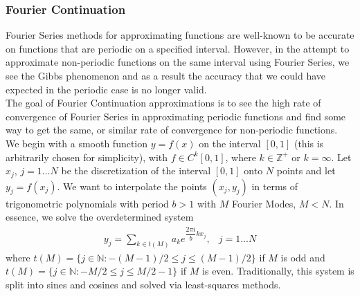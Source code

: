 \documentclass[11pt]{amsart}
\begin{document}
\subsubsection{Fourier Continuation}
Fourier Series methods for approximating functions are well-known to be accurate on functions that are periodic on a specified interval.  However, in the attempt to approximate non-periodic functions on the same interval using Fourier Series, we see the Gibbs phenomenon and as a result the accuracy that we could have expected in the periodic case is no longer valid.  \\
The goal of Fourier Continuation approximations is to see the high rate of convergence of Fourier Series in approximating periodic functions and find some way to get the same, or similar rate of convergence for non-periodic functions.  \\
We begin with a smooth function $y=f(x)$ on the interval $[0,1]$ (this is arbitrarily chosen for simplicity), with $f\in C^k[0,1]$, where $k \in \mathbb{Z}^{+}$ or $k=\infty$.  Let $x_j$, $j=1 \ldots N$ be the discretization of the interval $[0,1]$ onto $N$ points and let $y_j  = f(x_j)$.  
We want to interpolate the points $(x_j,y_j)$ in terms of trigonometric polynomials with period $b>1$ with $M$ Fourier Modes, $M<N$.  
In essence, we solve the overdetermined system
\begin{eqnarray}
y_j=\sum_{k\in t(M)} a_k e^{\dfrac{2\pi i}{b}kx_j}, &j=1\ldots N
\end{eqnarray}
where $t(M)=\{j\in \mathbb{N}: -(M-1)/2 \leq j \leq (M-1)/2\}$ if $M$ is odd and $t(M)=\{j\in \mathbb{N}: -M/2\leq j \leq M/2-1\}$ if $M$ is even. 
Traditionally, this system is split into sines and cosines and solved via least-squares methods.  
\end{document}
